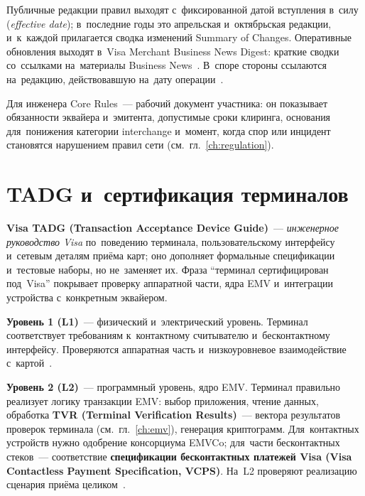 Публичные редакции правил выходят с~фиксированной датой вступления в~силу
(\textit{effective date}); в~последние годы это апрельская и~октябрьская
редакции, и~к~каждой прилагается сводка изменений Summary of Changes.
Оперативные обновления выходят в~Visa Merchant Business News Digest:
краткие сводки со~ссылками на~материалы Business News~\cite{visa-core-rules,visa-business-news-digest}. В~споре стороны
ссылаются на~редакцию, действовавшую на~дату операции~\cite{visa-core-rules}.

Для инженера Core Rules~--- рабочий документ участника: он показывает
обязанности эквайера и~эмитента, допустимые сроки клиринга, основания
для~понижения категории interchange и~момент, когда спор или инцидент
становятся нарушением правил сети
(см.~гл.~\ref{ch:regulation}).


\section{TADG и~сертификация терминалов}\label{sec:visa-tadg}

\textbf{Visa TADG (Transaction Acceptance Device Guide)}~--- \emph{инженерное
руководство Visa} по~поведению терминала, пользовательскому интерфейсу
и~сетевым деталям приёма карт; оно дополняет формальные спецификации и~тестовые
наборы, но не~заменяет их. Фраза \enquote{терминал сертифицирован под~Visa}
покрывает проверку аппаратной части, ядра EMV и~интеграции устройства
с~конкретным эквайером.

\textbf{Уровень 1 (L1)}~--- физический и~электрический уровень. Терминал
соответствует требованиям к~контактному считывателю и~бесконтактному интерфейсу. Проверяются аппаратная часть и~низкоуровневое
взаимодействие с~картой~\cite{visa-tadg}.

\textbf{Уровень 2 (L2)}~--- программный уровень, ядро EMV. Терминал правильно
реализует логику транзакции EMV: выбор приложения, чтение данных, обработка
\textbf{TVR (Terminal Verification Results)}~--- вектора результатов проверок
терминала (см.~гл.~\ref{ch:emv}), генерация криптограмм. Для~контактных
устройств нужно одобрение консорциума EMVCo; для~части
бесконтактных стеков~--- соответствие \textbf{спецификации бесконтактных
платежей Visa (Visa Contactless Payment Specification, VCPS)}. На~L2 проверяют
реализацию сценария приёма целиком~\cite{visa-tadg}.


